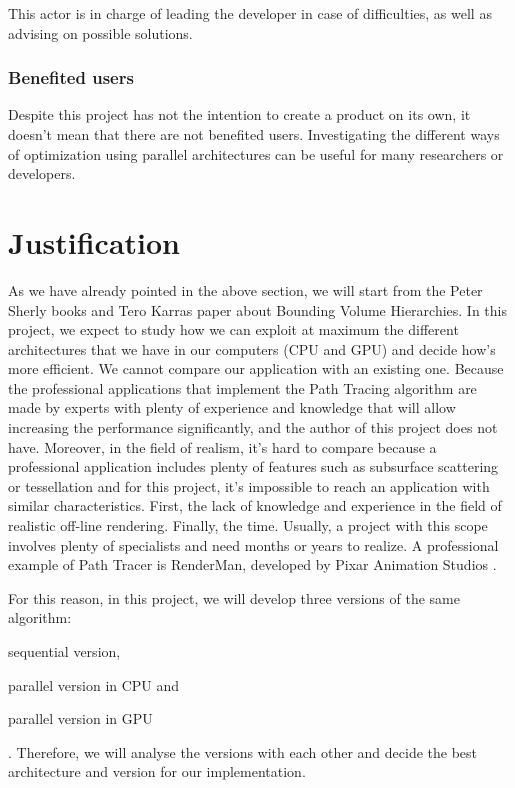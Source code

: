 \documentclass[titlepage,12pt]{report}
\begin{document}
This actor is in charge of leading the developer in case of difficulties, as well as advising on possible solutions.

\subsubsection{Benefited users}

Despite this project has not the intention to create a product on its own, it doesn't mean that there are not benefited users. Investigating the different ways of optimization using parallel architectures can be useful for many researchers or developers.

\section{Justification}

As we have already pointed in the above section, we will start from the Peter Sherly books and Tero Karras paper about Bounding Volume Hierarchies. In this project, we expect to study how we can exploit at maximum the different architectures that we have in our computers (CPU and GPU) and decide how's more efficient. We cannot compare our application with an existing one. Because the professional applications that implement the Path Tracing algorithm are made by experts with plenty of experience and knowledge that will allow increasing the performance significantly, and the author of this project does not have. Moreover, in the field of realism, it's hard to compare because a professional application includes plenty of features such as subsurface scattering or tessellation and for this project, it's impossible to reach an application with similar characteristics. First, the lack of knowledge and experience in the field of realistic off-line rendering.
Finally, the time. Usually, a project with this scope involves plenty of specialists and need months or years to realize. A professional example of Path Tracer is RenderMan, developed by Pixar Animation Studios \citep{Christensen2018}.

For this reason, in this project, we will develop three versions of the same algorithm: \begin{enumerate*}[label=\roman*)] \item sequential version, \item parallel version in CPU and \item parallel version in GPU \end{enumerate*}. Therefore, we will analyse the versions with each other and decide the best architecture and version for our implementation.
\end{document}
